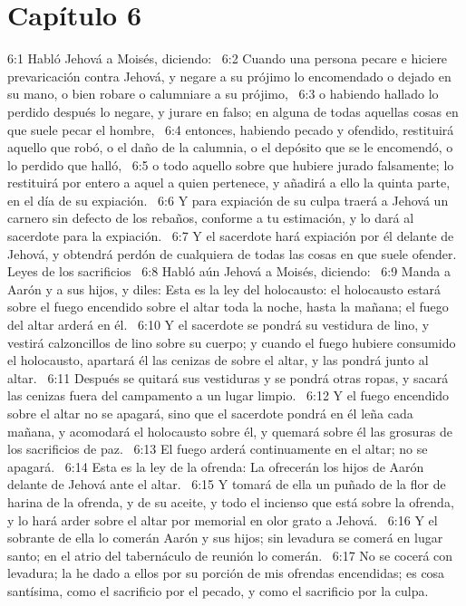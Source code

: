 \section*{Capítulo 6 }

6:1 Habló Jehová a Moisés, diciendo:  
6:2 Cuando una persona pecare e hiciere prevaricación contra Jehová, y negare a su prójimo lo encomendado o dejado en su mano, o bien robare o calumniare a su prójimo,  
6:3 o habiendo hallado lo perdido después lo negare, y jurare en falso; en alguna de todas aquellas cosas en que suele pecar el hombre,  
6:4 entonces, habiendo pecado y ofendido, restituirá aquello que robó, o el daño de la calumnia, o el depósito que se le encomendó, o lo perdido que halló,  
6:5 o todo aquello sobre que hubiere jurado falsamente; lo restituirá por entero a aquel a quien pertenece, y añadirá a ello la quinta parte, en el día de su expiación.  
6:6 Y para expiación de su culpa traerá a Jehová un carnero sin defecto de los rebaños, conforme a tu estimación, y lo dará al sacerdote para la expiación.  
6:7 Y el sacerdote hará expiación por él delante de Jehová, y obtendrá perdón de cualquiera de todas las cosas en que suele ofender.  
Leyes de los sacrificios  
6:8 Habló aún Jehová a Moisés, diciendo:  
6:9 Manda a Aarón y a sus hijos, y diles: Esta es la ley del holocausto: el holocausto estará sobre el fuego encendido sobre el altar toda la noche, hasta la mañana; el fuego del altar arderá en él.  
6:10 Y el sacerdote se pondrá su vestidura de lino, y vestirá calzoncillos de lino sobre su cuerpo; y cuando el fuego hubiere consumido el holocausto, apartará él las cenizas de sobre el altar, y las pondrá junto al altar.  
6:11 Después se quitará sus vestiduras y se pondrá otras ropas, y sacará las cenizas fuera del campamento a un lugar limpio.  
6:12 Y el fuego encendido sobre el altar no se apagará, sino que el sacerdote pondrá en él leña cada mañana, y acomodará el holocausto sobre él, y quemará sobre él las grosuras de los sacrificios de paz.  
6:13 El fuego arderá continuamente en el altar; no se apagará.  
6:14 Esta es la ley de la ofrenda: La ofrecerán los hijos de Aarón delante de Jehová ante el altar.  
6:15 Y tomará de ella un puñado de la flor de harina de la ofrenda, y de su aceite, y todo el incienso que está sobre la ofrenda, y lo hará arder sobre el altar por memorial en olor grato a Jehová.  
6:16 Y el sobrante de ella lo comerán Aarón y sus hijos; sin levadura se comerá en lugar santo; en el atrio del tabernáculo de reunión lo comerán.  
6:17 No se cocerá con levadura; la he dado a ellos por su porción de mis ofrendas encendidas; es cosa santísima, como el sacrificio por el pecado, y como el sacrificio por la culpa.  
